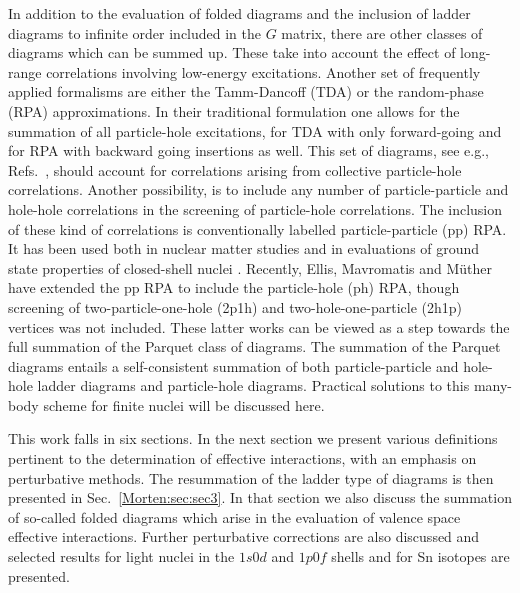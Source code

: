 In addition to the evaluation of folded diagrams and the inclusion
of ladder diagrams to infinite order included in the $G$ matrix, there
are other classes of diagrams which can be summed up. 
These take into account
the effect of long-range correlations involving low-energy excitations.
Another set of frequently applied formalisms are either
the Tamm-Dancoff (TDA)
or the random-phase
(RPA) approximations. In their traditional formulation one allows for
the summation of all particle-hole excitations, 
for TDA with only forward-going and for RPA with 
backward going insertions as well.  This set of diagrams, see e.g., 
Refs.\ 
\cite{Morten:kirson74,Morten:eo77}, should account for correlations arising
from collective particle-hole correlations. Another possibility, is to
include any number of particle-particle and hole-hole correlations in
the screening of particle-hole correlations.  The inclusion of these
kind of correlations is conventionally labelled particle-particle (pp)
RPA.
 It has been used both in nuclear matter
studies \cite{Morten:angels88,Morten:rpd89,Morten:yhk86,Morten:syk87}
and in evaluations of ground state properties of closed-shell
nuclei \cite{Morten:hmtk87,Morten:emm91,Morten:hmm95}.
Recently, Ellis, Mavromatis and M\"uther \cite{Morten:emm91,Morten:hmm95} have
extended the pp RPA to include the particle-hole (ph) RPA, 
though
screening of two-particle-one-hole (2p1h) and two-hole-one-particle
(2h1p) vertices was not included.
These latter works can be viewed as a step towards the full summation of the
Parquet class of diagrams. 
The summation of the Parquet diagrams entails a self-consistent
summation of both particle-particle and hole-hole ladder diagrams
and particle-hole diagrams. Practical solutions to this many-body
scheme for finite nuclei will be discussed here.

This work falls in six sections.
In the next section we present various definitions pertinent
to the determination of effective interactions, with an emphasis
on perturbative methods.
The resummation of the ladder type of 
diagrams is then presented in Sec.~\ref{Morten:sec:sec3}.
In that section we also discuss the summation of so-called
folded diagrams which arise in the evaluation of 
valence space effective interactions. Further perturbative 
corrections are also discussed and selected results
for light nuclei in the $1s0d$ and $1p0f$ shells and for
Sn isotopes are presented.

